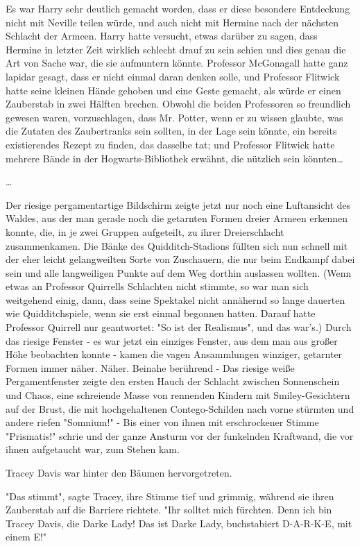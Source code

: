 {Es war Harry sehr deutlich gemacht worden, dass er diese besondere Entdeckung nicht mit Neville teilen würde, und auch nicht mit Hermine nach der nächsten Schlacht der Armeen. Harry hatte versucht, etwas darüber zu sagen, dass Hermine in letzter Zeit wirklich schlecht drauf zu sein schien und dies genau die Art von Sache war, die sie aufmuntern könnte. Professor McGonagall hatte ganz lapidar gesagt, dass er nicht einmal daran denken solle, und Professor Flitwick hatte seine kleinen Hände gehoben und eine Geste gemacht, als würde er einen Zauberstab in zwei Hälften brechen. Obwohl die beiden Professoren so freundlich gewesen waren, vorzuschlagen, dass Mr. Potter, wenn er zu wissen glaubte, was die Zutaten des Zaubertranks sein sollten, in der Lage sein könnte, ein bereits existierendes Rezept zu finden, das dasselbe tat; und Professor Flitwick hatte mehrere Bände in der Hogwarts-Bibliothek erwähnt, die nützlich sein könnten…

…

Der riesige pergamentartige Bildschirm zeigte jetzt nur noch eine Luftansicht des Waldes, aus der man gerade noch die getarnten Formen dreier Armeen erkennen konnte, die, in je zwei Gruppen aufgeteilt, zu ihrer Dreierschlacht zusammenkamen. Die Bänke des Quidditch-Stadions füllten sich nun schnell mit der eher leicht gelangweilten Sorte von Zuschauern, die nur beim Endkampf dabei sein und alle langweiligen Punkte auf dem Weg dorthin auslassen wollten. (Wenn etwas an Professor Quirrells Schlachten nicht stimmte, so war man sich weitgehend einig, dann, dass seine Spektakel nicht annähernd so lange dauerten wie Quidditchspiele, wenn sie erst einmal begonnen hatten. Darauf hatte Professor Quirrell nur geantwortet: "So ist der Realismus", und das war's.) Durch das riesige Fenster - es war jetzt ein einziges Fenster, aus dem man aus großer Höhe beobachten konnte - kamen die vagen Ansammlungen winziger, getarnter Formen immer näher. Näher. Beinahe berührend - Das riesige weiße Pergamentfenster zeigte den ersten Hauch der Schlacht zwischen Sonnenschein und Chaos, eine schreiende Masse von rennenden Kindern mit Smiley-Gesichtern auf der Brust, die mit hochgehaltenen Contego-Schilden nach vorne stürmten und andere riefen "Somnium!" - Bis einer von ihnen mit erschrockener Stimme "Prismatis!" schrie und der ganze Ansturm vor der funkelnden Kraftwand, die vor ihnen aufgetaucht war, zum Stehen kam.

Tracey Davis war hinter den Bäumen hervorgetreten.

"Das stimmt", sagte Tracey, ihre Stimme tief und grimmig, während sie ihren Zauberstab auf die Barriere richtete. "Ihr solltet mich fürchten. Denn ich bin Tracey Davis, die Darke Lady! Das ist Darke Lady, buchstabiert D-A-R-K-E, mit einem E!"

}
